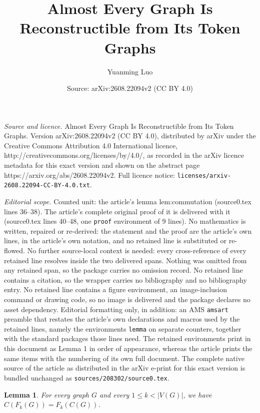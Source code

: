 \documentclass[10pt,a4paper]{amsart}
\title{Almost Every Graph Is Reconstructible from Its Token Graphs}
\author{Yuanming Luo}
\date{Source: arXiv:2608.22094v2 (CC BY 4.0)}
\newtheorem{lemma}{Lemma}
\begin{document}
\maketitle

\noindent\emph{Source and licence.} Almost Every Graph Is Reconstructible from Its Token Graphs. Version arXiv:2608.22094v2 (CC BY 4.0), distributed by arXiv under the Creative Commons Attribution 4.0 International licence, http://creativecommons.org/licenses/by/4.0/, as recorded in the arXiv licence metadata for this exact version and shown on the abstract page https://arxiv.org/abs/2608.22094v2. Full licence notice: \texttt{licenses/arxiv-2608.22094-CC-BY-4.0.txt}.\par\smallskip

\noindent\textit{Editorial scope.} Counted unit: the article's lemma lem:commutation (source0.tex lines 36--38). The article's complete original proof of it is delivered with it (source0.tex lines 40--48, one \texttt{proof} environment of 9 lines). No mathematics is written, repaired or re-derived: the statement and the proof are the article's own lines, in the article's own notation, and no retained line is substituted or re-flowed.  No further source-local context is needed: every cross-reference of every retained line resolves inside the two delivered spans.  Nothing was omitted from any retained span, so the package carries no omission record.  No retained line contains a citation, so the wrapper carries no bibliography and no bibliography entry.  No retained line contains a figure environment, an image-inclusion command or drawing code, so no image is delivered and the package declares no asset dependency.  Editorial formatting only, in addition: an AMS \texttt{amsart} preamble that restates the article's own declarations and macros used by the retained lines, namely the environments \texttt{lemma} on separate counters, together with the standard packages those lines need.  The retained environments print in this document as Lemma 1 in order of appearance, whereas the article prints the same items with the numbering of its own full document.  The complete native source of the article as distributed in the arXiv e-print for this exact version is bundled unchanged as \texttt{sources/208302/source0.tex}.
\begin{lemma}\label{lem:commutation}
For every graph $G$ and every $1\leq k<|V(G)|$, we have $C(F_k(G))=F_k(C(G))$.
\end{lemma}
\end{document}
